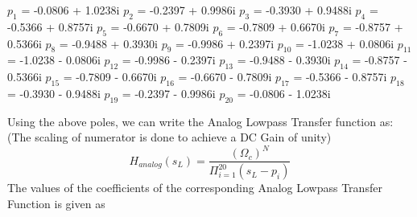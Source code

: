 \documentclass{article}
\begin{document}
\noindent
\vspace{1em}
\begin{center}
$p_1$ = -0.0806 + 1.0238i \newline
$p_2$ = -0.2397 + 0.9986i  \newline
$p_3$ = -0.3930 + 0.9488i \newline
$p_4$ = -0.5366 + 0.8757i \newline
$p_5$ = -0.6670 + 0.7809i \newline
$p_6$ = -0.7809 + 0.6670i \newline
$p_7$ = -0.8757 + 0.5366i \newline
$p_8$ = -0.9488 + 0.3930i \newline
$p_9$ = -0.9986 + 0.2397i  \newline
$p_{10}$ =  -1.0238 + 0.0806i   \newline
$p_{11}$ = -1.0238 - 0.0806i   \newline
$p_{12}$ = -0.9986 - 0.2397i     \newline
$p_{13}$ = -0.9488 - 0.3930i     \newline
$p_{14}$ = -0.8757 - 0.5366i   \newline
$p_{15}$ = -0.7809 - 0.6670i     \newline
$p_{16}$ = -0.6670 - 0.7809i       \newline
$p_{17}$ = -0.5366 - 0.8757i       \newline
$p_{18}$ = -0.3930 - 0.9488i       \newline
$p_{19}$ = -0.2397 - 0.9986i       \newline
$p_{20}$ = -0.0806 - 1.0238i     \newline
\end{center}
\noindent
\vspace{1em}
Using the above poles, we can write the Analog Lowpass Transfer function as:
(The scaling of numerator is done to achieve a DC Gain of unity)
\begin{equation*}
    H_{analog}(s_L) = \frac{(\Omega_c)^N}{\Pi_{i=1}^{20} (s_L-p_i)}
\end{equation*}
The values of the coefficients of the corresponding Analog Lowpass Transfer Function  is given as
\end{document}
